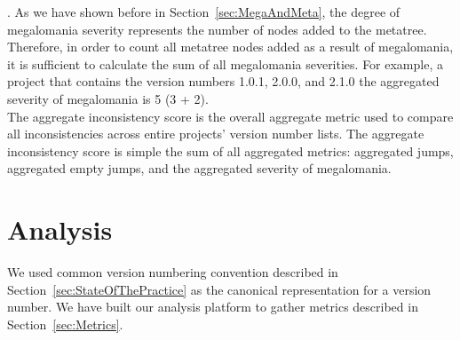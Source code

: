 \documentclass[conference]{IEEEtran}
\begin{document}
.  
As we have shown before in Section~\ref{sec:MegaAndMeta}, the degree of megalomania severity represents the number of nodes added to the metatree.
Therefore, in order to count all metatree nodes added as a result of megalomania, it is sufficient to calculate the sum of all megalomania severities.
For example, a project that contains the version numbers 1.0.1, 2.0.0, and 2.1.0 the aggregated severity of megalomania is 5 (3 + 2). \\


% 

The aggregate inconsistency score is the overall aggregate metric used to compare all inconsistencies across entire projects' version number lists.
The aggregate inconsistency score is simple the sum of all aggregated metrics: aggregated jumps, aggregated empty jumps, and the aggregated severity of megalomania. 


\section{Analysis}

We used common version numbering convention described in Section~\ref{sec:StateOfThePractice} as the canonical representation for a version number. We have built our analysis platform to gather metrics described in Section~\ref{sec:Metrics}. 
\end{document}

